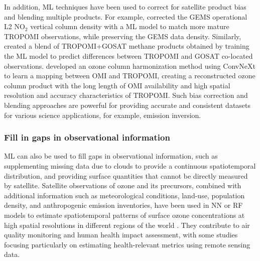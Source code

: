 \documentclass[gmd, manuscript]{copernicus}
\begin{document}
In addition, ML techniques have been used to correct for satellite product bias and blending multiple products. For example, \citet{oak_bias-corrected_2024} corrected the GEMS operational L2 NO$_2$ vertical column density  with a ML model to match more mature TROPOMI observations, while preserving the GEMS data density. Similarly, \citet{balasus_blended_2023} created a blend of TROPOMI+GOSAT methane products obtained by training the ML model to predict differences between TROPOMI and GOSAT co-located observations. \citet{shi_harmonizing_2024} developed an ozone column harmonization method using ConvNeXt \citep{liu_convnet_2022} to learn a mapping between OMI and TROPOMI, creating a reconstructed ozone column product with the long length of OMI availability and high spatial resolution and accuracy characteristics of TROPOMI. Such bias correction and blending approaches are powerful for providing accurate and consistent datasets for various science applications, for example, emission inversion. 

\subsubsection{Fill in gaps in observational information }

ML can also be used to fill gaps in observational information, such as supplementing missing data due to clouds to provide a continuous spatiotemporal distribution, and providing surface quantities that cannot be directly measured by satellite. Satellite observations of ozone and its precursors, combined with additional information such as meteorological conditions, land-use, population density, and anthropogenic emission inventories, have been used in NN or RF models to estimate spatiotemporal patterns of surface ozone concentrations at high spatial resolutions in different regions of the world \citep{di_hybrid_2017, wang_machine_2022, zhu_combining_2022, kang_estimation_2021, ghahremanloo_deep_2023}.  They contribute to air quality monitoring and human health impact assessment, with some studies focusing particularly on estimating health-relevant metrics using remote sensing data. 
\end{document}
